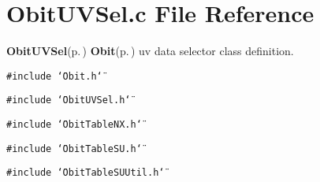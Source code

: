 \section{Obit\-UVSel.c File Reference}
\label{ObitUVSel_8c}
{\bf Obit\-UVSel}{\rm (p.\,\pageref{structObitUVSel})} {\bf Obit}{\rm (p.\,\pageref{structObit})} uv data selector class definition. 

{\tt \#include \char`\"{}Obit.h\char`\"{}}\par
{\tt \#include \char`\"{}Obit\-UVSel.h\char`\"{}}\par
{\tt \#include \char`\"{}Obit\-Table\-NX.h\char`\"{}}\par
{\tt \#include \char`\"{}Obit\-Table\-SU.h\char`\"{}}\par
{\tt \#include \char`\"{}Obit\-Table\-SUUtil.h\char`\"{}}\par
